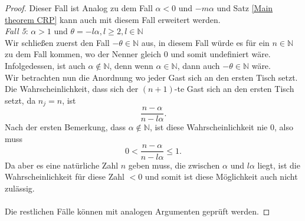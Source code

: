 \begin{proof}
Dieser Fall ist Analog zu dem Fall $\alpha < 0$ und $-m \alpha$ und Satz \ref{Main theorem CRP} kann auch mit diesem Fall erweitert werden.\\
\textit{Fall 5}: $\alpha >1$ und $\theta = -l\alpha, l \geq 2, l \in \mathbb{N}$\\
Wir schließen zuerst den Fall $-\theta \in \mathbb{N}$ aus, in diesem Fall würde es für ein $n \in \mathbb{N}$ zu dem Fall kommen, wo der Nenner gleich $0$ und somit undefiniert wäre. Infolgedessen, ist auch $\alpha \notin \mathbb{N}$, denn wenn $\alpha \in \mathbb{N}$, dann auch $-\theta \in \mathbb{N}$ wäre.\\
Wir betrachten nun die Anordnung wo jeder Gast sich an den ersten Tisch setzt. Die Wahrscheinlichkeit, dass sich der $(n+1)$-te Gast sich an den ersten Tisch setzt, da $n_j = n$, ist 
\[
    \frac{n- \alpha}{n - l \alpha}.   
\]
Nach der ersten Bemerkung, dass $\alpha \notin \mathbb{N}$, ist diese Wahrscheinlichkeit nie $0$, also muss 
\[
   0<  \frac{n- \alpha}{n - l \alpha} \leq 1.   
\]
Da aber es eine natürliche Zahl $n$ geben muss, die zwischen $\alpha$ und $l \alpha$ liegt, ist die Wahrscheinlichkeit für diese Zahl $<0$ und somit ist diese Möglichkeit auch nicht zulässig.
\\
\\
Die restlichen Fälle können mit analogen Argumenten geprüft werden.
\end{proof}